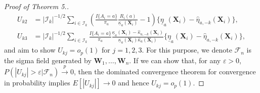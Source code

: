 \documentclass[12pt]{article}
\newcommand{\bX}{\boldsymbol{X}}
\newcommand{\bW}{\boldsymbol{W}}
\begin{document}
\begin{proof}[Proof of Theorem 5.]
\begin{align*}
    U_{k2} &= |\mathcal{I}_k|^{-1/2} \sum_{i \in \mathcal{I}_k} \left(\frac{I\{A_i=a\}}{\pi_a} \frac{R_i(a)}{\underline{\kappa}_a(\bX_i)}-1\right)  \{\underline{\eta}_a(\bX_i)-\widehat{\eta}_{a,-k}(\bX_i)\},\\
    U_{k3} &= |\mathcal{I}_k|^{-1/2} \sum_{i \in \mathcal{I}_k} \frac{I\{A_i=a\}}{\pi_a} \frac{\underline{\kappa}_a(\bX_i) - \widehat{\kappa} _{a,-k}(\bX_i)}{\underline{\kappa}_a(\bX_i)\widehat{\kappa}_a(\bX_i)}\{\underline{\eta}_{a}(\bX_i)-\widehat{\eta}_{a,-k}(\bX_i)\},
\end{align*}
and aim to show $U_{kj} = o_p(1)$ for $j=1,2,3$.  For this purpose, we denote $\mathcal{F}_n$ is the sigma field generated by $\bW_1,\dots,\bW_n$. If we can show that, for any $\varepsilon>0$, $P(|U_{kj}|>\varepsilon|\mathcal{F}_n) \xrightarrow{p} 0$, then the dominated convergence theorem for convergence in probability \citep[Theorem 1.5.3]{durrett2019probability} implies $E[|U_{kj}|]\rightarrow 0$ and hence $U_{kj} = o_p(1)$.


\end{proof}
\end{document}
